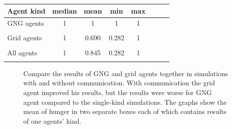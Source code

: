 \begin{center}
  \begin{tabular}{l*{6}{c}r}
  Agent kind        & median & mean & min & max \\
  \hline
  GNG agents        & 1 & 1 & 1 & 1  \\   
                    & \\
  Grid agents       & 1 & 0.690                 & 0.282 & 1  \\  
                    &   & \color{green}{+0.006} & \color{red}{-0.002}  \\
  All agents        & 1 & 0.845               & 0.282 & 1  \\
                    &   & \color{red}{-0.05} & \color{red}{-0.002} \\
  \end{tabular}                                 
\end{center}




\begin{figure}[h!]
  \centering          
  \caption{Compare the results of GNG and grid agents together in simulations with and without communication. With communication the grid agent improved his results, but the results were worse for GNG agent compared to the single-kind simulations. The graphs show the mean of hunger in two separate boxes each of which contains results of one agents' kind.}
\end{figure}